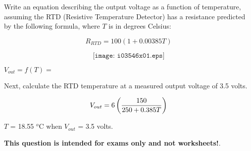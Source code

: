 

Write an equation describing the output voltage as a function of temperature, assuming the RTD (Resistive Temperature Detector) has a resistance predicted by the following formula, where $T$ is in degrees Celsius:

$$R_{RTD} = 100 (1 + 0.00385T)$$

$$\texttt{[image: i03546x01.eps]}$$

\vskip 30pt

$V_{out} = f(T) = $

\vskip 30pt

Next, calculate the RTD temperature at a measured output voltage of 3.5 volts.







$$V_{out} = 6 \left(150 \over 250 + 0.385T \right)$$

\vskip 10pt

$T$ = 18.55 $^{o}$C when $V_{out}$ = 3.5 volts.







{\bf This question is intended for exams only and not worksheets!}.



